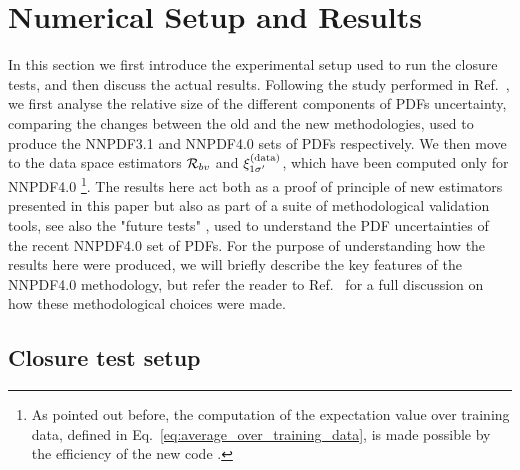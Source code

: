 \section{Numerical Setup and Results}

In this section we first introduce the experimental setup used to run the
closure tests, and then discuss the actual results. Following the study
performed in Ref.~\cite{nnpdf30}, we first analyse the relative size of the
different components of PDFs uncertainty, comparing the changes between the old
and the new methodologies, used to produce the NNPDF3.1 \cite{Ball_2017} and
NNPDF4.0 \cite{NNPDF40} sets of PDFs respectively. We then move to the data
space estimators $\mathcal{R}_{bv}$ and $\xi^{(\rm data)}_{1 {{\sigma}^{\prime}}}$, which have been computed
only for NNPDF4.0 \footnote{As pointed out before, the computation of the
expectation value over training data, defined in
Eq.~\ref{eq:average_over_training_data}, is made possible by the efficiency of
the new code \cite{nnpdf40code}.}. The results here act both as a proof of
principle of new estimators presented in this paper but also as part of a suite
of methodological validation tools, see also the "future tests"
\cite{Cruz_Martinez_2021}, used to understand the PDF uncertainties of the
recent NNPDF4.0 set of PDFs. For the purpose of understanding how the results
here were produced, we will briefly describe the key features of the NNPDF4.0
methodology, but refer the reader to Ref.~\cite{NNPDF40} for a full discussion on how these
methodological choices were made.

\subsection{Closure test setup}

